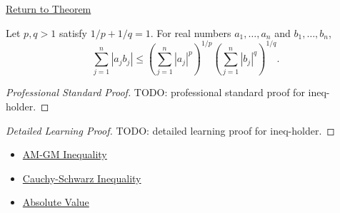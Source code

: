 \newpage
{}
\label{prf:ineq-holder}

\begin{remark*}[Return]
\hyperref[thm:ineq-holder]{Return to Theorem}
\end{remark*}

\begin{theorem*}
Let $p,q>1$ satisfy $1/p+1/q=1$. For real numbers $a_1,\dots,a_n$ and
$b_1,\dots,b_n$,
\[
\sum_{j=1}^{n}|a_jb_j|
\le
\left(\sum_{j=1}^{n}|a_j|^p\right)^{1/p}
\left(\sum_{j=1}^{n}|b_j|^q\right)^{1/q}.
\]
\end{theorem*}

\begin{proof}[Professional Standard Proof]
\LRAProofBodyStart
TODO: professional standard proof for ineq-holder.
\end{proof}

\begin{proof}[Detailed Learning Proof]
\LRAProofBodyStart
TODO: detailed learning proof for ineq-holder.
\end{proof}

\begin{remark*}
\end{remark*}

\begin{dependencies}
\begin{itemize}
  \item \hyperref[thm:ineq-am-gm]{AM-GM Inequality}
  \item \hyperref[thm:ineq-cauchy-schwarz]{Cauchy-Schwarz Inequality}
  \item \hyperref[def:absolute-value]{Absolute Value}
\end{itemize}
\end{dependencies}

\clearpage

